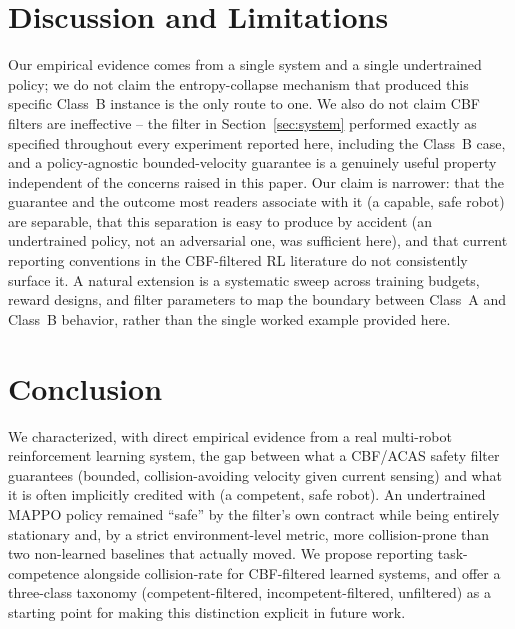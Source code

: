 \documentclass[12pt]{article}
\begin{document}
\section{Discussion and Limitations}
Our empirical evidence comes from a single system and a single undertrained
policy; we do not claim the entropy-collapse mechanism that produced this
specific Class~B instance is the only route to one. We also do not claim CBF
filters are ineffective -- the filter in Section~\ref{sec:system} performed
exactly as specified throughout every experiment reported here, including the
Class~B case, and a policy-agnostic bounded-velocity guarantee is a genuinely
useful property independent of the concerns raised in this paper. Our claim
is narrower: that the guarantee and the outcome most readers associate with
it (a capable, safe robot) are separable, that this separation is easy to
produce by accident (an undertrained policy, not an adversarial one, was
sufficient here), and that current reporting conventions in the CBF-filtered
RL literature do not consistently surface it. A natural extension is a
systematic sweep across training budgets, reward designs, and filter
parameters to map the boundary between Class~A and Class~B behavior, rather
than the single worked example provided here.

\section{Conclusion}
We characterized, with direct empirical evidence from a real multi-robot
reinforcement learning system, the gap between what a CBF/ACAS safety filter
guarantees (bounded, collision-avoiding velocity given current sensing) and
what it is often implicitly credited with (a competent, safe robot). An
undertrained MAPPO policy remained ``safe'' by the filter's own contract
while being entirely stationary and, by a strict environment-level metric,
more collision-prone than two non-learned baselines that actually moved. We
propose reporting task-competence alongside collision-rate for CBF-filtered
learned systems, and offer a three-class taxonomy (competent-filtered,
incompetent-filtered, unfiltered) as a starting point for making this
distinction explicit in future work.



\end{document}
